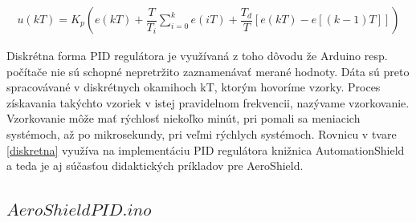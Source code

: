 \begin{align}
	\label{diskretna}
	u(kT)=K_p \left(e(kT) + \dfrac{T}{T_i} \sum_{i=0}^{k}  e(iT) + \dfrac{T_d}{T} \left[e(kT)-e \left[(k - 1)T\right] \right] \right)
\end{align}

Diskrétna forma PID regulátora je využívaná z toho dôvodu že Arduino resp. počítače nie sú schopné nepretržito zaznamenávať merané hodnoty. Dáta sú preto spracovávané v diskrétnych okamihoch kT, ktorým hovoríme vzorky. Proces získavania takýchto vzoriek v istej pravidelnom frekvencii, nazývame vzorkovanie. Vzorkovanie môže mať rýchlosť niekoľko minút, pri pomali sa meniacich systémoch, až po mikrosekundy, pri veľmi rýchlych systémoch. Rovnicu v tvare \ref{diskretna} využíva na implementáciu PID regulátora knižnica AutomationShield a teda je aj súčasťou didaktických príkladov pre AeroShield. 

\subsection{$AeroShieldPID.ino$}


